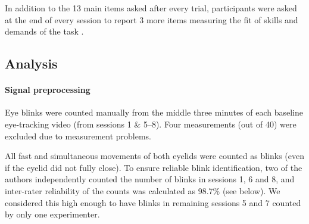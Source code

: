 \documentclass[10pt,letterpaper,floatsintext]{article}
\begin{document}
In addition to the 13 main items asked after every trial, participants were asked at the end of every session to report 3 more items measuring the fit of skills and demands of the task \cite{Rheinberg2003}.

%
%

\subsection*{Analysis}

\paragraph{Signal preprocessing}
Eye blinks were counted manually from the middle three minutes of each baseline eye-tracking video (from sessions 1 \& 5--8). Four measurements (out of 40) were excluded due to measurement problems.

All fast and simultaneous movements of both eyelids were counted as blinks (even if the eyelid did not fully close). To ensure reliable blink identification, two of the authors independently counted the number of blinks in sessions 1, 6 and 8, and inter-rater reliability of the counts was calculated as 98.7\% (see below). We considered this high enough to have blinks in remaining sessions 5 and 7 counted by only one experimenter.
\end{document}
